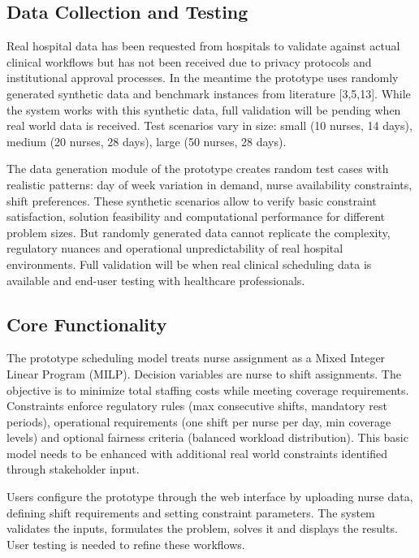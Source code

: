 \documentclass[1pt,a4paper]{article}
\begin{document}
\subsection{Data Collection and Testing}

Real hospital data has been requested from hospitals to validate against actual clinical workflows but has not been received due to privacy protocols and institutional approval processes. In the meantime the prototype uses randomly generated synthetic data and benchmark instances from literature [3,5,13]. While the system works with this synthetic data, full validation will be pending when real world data is received. Test scenarios vary in size: small (10 nurses, 14 days), medium (20 nurses, 28 days), large (50 nurses, 28 days).

The data generation module of the prototype creates random test cases with realistic patterns: day of week variation in demand, nurse availability constraints, shift preferences. These synthetic scenarios allow to verify basic constraint satisfaction, solution feasibility and computational performance for different problem sizes. But randomly generated data cannot replicate the complexity, regulatory nuances and operational unpredictability of real hospital environments. Full validation will be when real clinical scheduling data is available and end-user testing with healthcare professionals.

\subsection{Core Functionality}

The prototype scheduling model treats nurse assignment as a Mixed Integer Linear Program (MILP). Decision variables are nurse to shift assignments. The objective is to minimize total staffing costs while meeting coverage requirements. Constraints enforce regulatory rules (max consecutive shifts, mandatory rest periods), operational requirements (one shift per nurse per day, min coverage levels) and optional fairness criteria (balanced workload distribution). This basic model needs to be enhanced with additional real world constraints identified through stakeholder input.

Users configure the prototype through the web interface by uploading nurse data, defining shift requirements and setting constraint parameters. The system validates the inputs, formulates the problem, solves it and displays the results. User testing is needed to refine these workflows.
\end{document}
